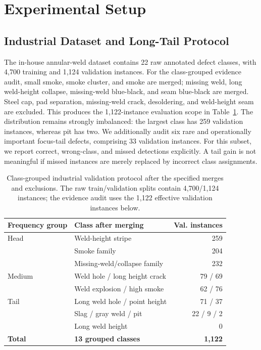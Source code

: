 \section{Experimental Setup}

\subsection{Industrial Dataset and Long-Tail Protocol}

The in-house annular-weld dataset contains 22 raw annotated defect classes, with 4,700 training and 1,124 validation instances. For the class-grouped evidence audit, small smoke, smoke cluster, and smoke are merged; missing weld, long weld-height collapse, missing-weld blue-black, and seam blue-black are merged. Steel cap, pad separation, missing-weld crack, desoldering, and weld-height seam are excluded. This produces the 1,122-instance evaluation scope in Table~\ref{tab:dataset}. The distribution remains strongly imbalanced: the largest class has 259 validation instances, whereas pit has two. We additionally audit six rare and operationally important focus-tail defects, comprising 33 validation instances. For this subset, we report correct, wrong-class, and missed detections explicitly. A tail gain is not meaningful if missed instances are merely replaced by incorrect class assignments.

\begin{table}[t]
\caption{Class-grouped industrial validation protocol after the specified merges and exclusions. The raw train/validation splits contain 4,700/1,124 instances; the evidence audit uses the 1,122 effective validation instances below.}
\label{tab:dataset}
\centering
\scriptsize
\setlength{\tabcolsep}{2.6pt}
\begin{tabular}{llr}
\toprule
Frequency group & Class after merging & Val. instances \\
\midrule
Head & Weld-height stripe & 259 \\
     & Smoke family & 204 \\
     & Missing-weld/collapse family & 232 \\
\midrule
Medium & Weld hole / long height crack & 79 / 69 \\
       & Weld explosion / high smoke & 62 / 76 \\
\midrule
Tail & Long weld hole / point height & 71 / 37 \\
     & Slag / gray weld / pit & 22 / 9 / 2 \\
     & Long weld height & 0 \\
\midrule
\textbf{Total} & \textbf{13 grouped classes} & \textbf{1,122} \\
\bottomrule
\end{tabular}
\end{table}
